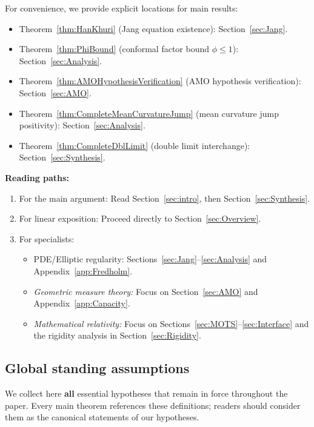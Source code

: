 \begin{remark}\label{rem:ForwardReferences}
For convenience, we provide explicit locations for main results:
\begin{itemize}
    \item Theorem~\ref{thm:HanKhuri} (Jang equation existence): Section~\ref{sec:Jang}.
    \item Theorem~\ref{thm:PhiBound} (conformal factor bound $\phi \le 1$): Section~\ref{sec:Analysis}.
    \item Theorem~\ref{thm:AMOHypothesisVerification} (AMO hypothesis verification): Section~\ref{sec:AMO}.
    \item Theorem~\ref{thm:CompleteMeanCurvatureJump} (mean curvature jump positivity): Section~\ref{sec:Analysis}.
    \item Theorem~\ref{thm:CompleteDblLimit} (double limit interchange): Section~\ref{sec:Synthesis}.
\end{itemize}

\textbf{Reading paths:}
\begin{enumerate}
    \item For the main argument: Read Section~\ref{sec:intro}, then Section~\ref{sec:Synthesis}.
    \item For linear exposition: Proceed directly to Section~\ref{sec:Overview}.
    \item For specialists:
    \begin{itemize}
        \item PDE/Elliptic regularity: Sections~\ref{sec:Jang}--\ref{sec:Analysis} and Appendix~\ref{app:Fredholm}.
        \item \textit{Geometric measure theory:} Focus on Section~\ref{sec:AMO} and Appendix~\ref{app:Capacity}.
        \item \textit{Mathematical relativity:} Focus on Sections~\ref{sec:MOTS}--\ref{sec:Interface} and the rigidity analysis in Section~\ref{sec:Rigidity}.
    \end{itemize}
\end{enumerate}
\end{remark}



\subsection{Global standing assumptions}\label{sec:assumptions}
We collect here \textbf{all} essential hypotheses that remain in force throughout the paper. Every main theorem references these definitions; readers should consider them as the canonical statements of our hypotheses.

